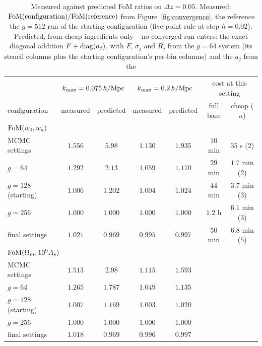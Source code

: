 \documentclass[11pt]{article}
\newcommand{\kmax}{k_{\rm max}}
\newcommand{\hMpc}{\,h/{\rm Mpc}}
\begin{document}
\begin{table}[tbp]
  \centering
  \setlength{\tabcolsep}{4pt}%
  \begin{tabular}{lcccccc}
    \hline
    & \multicolumn{2}{c}{$\kmax = 0.075\hMpc$}
    & \multicolumn{2}{c}{$\kmax = 0.2\hMpc$}
    & \multicolumn{2}{c}{cost at this setting} \\
    configuration & measured & predicted & measured & predicted
                  & full base & cheap ($n$) \\
    \hline
    \multicolumn{7}{l}{${\rm FoM}(w_0, w_a)$} \\
    MCMC settings        & $1.556$ & $5.98$  & $1.130$ & $1.935$ & $10$ min  & $35$ s ($2$) \\
    $g = 64$             & $1.292$ & $2.13$  & $1.059$ & $1.170$ & $29$ min  & $1.7$ min ($2$) \\
    $g = 128$ (starting) & $1.006$ & $1.202$ & $1.004$ & $1.024$ & $44$ min  & $3.7$ min ($3$) \\
    $g = 256$            & $1.000$ & $1.000$ & $1.000$ & $1.000$ & $1.2$ h   & $6.1$ min ($3$) \\
    final settings       & $1.021$ & $0.969$ & $0.995$ & $0.997$ & $50$ min  & $6.8$ min ($5$) \\
    \hline
    \multicolumn{7}{l}{${\rm FoM}(\Omega_m, 10^9 A_s)$} \\
    MCMC settings        & $1.513$ & $2.98$  & $1.115$ & $1.593$ \\
    $g = 64$             & $1.265$ & $1.787$ & $1.049$ & $1.135$ \\
    $g = 128$ (starting) & $1.007$ & $1.169$ & $1.003$ & $1.020$ \\
    $g = 256$            & $1.000$ & $1.000$ & $1.000$ & $1.000$ \\
    final settings       & $1.018$ & $0.969$ & $0.996$ & $0.997$ \\
    \hline
  \end{tabular}
  \caption{Measured against predicted FoM ratios on
    $\Delta z = 0.05$.  Measured:
    ${\rm FoM}({\rm configuration})/{\rm FoM}({\rm reference})$
    from Figure~\ref{fig:convergence}, the reference the $g = 512$
    run of the starting configuration (five-point rule at step
    $h = 0.02$).  Predicted, from cheap ingredients only -- no
    converged run enters: the exact diagonal addition
    $F + {\rm diag}(a_j)$, with $F$, $\sigma_j$ and $R_j$ from the
    $g = 64$ system (its stencil columns plus the starting
    configuration's per-bin columns) and the $a_j$ from the
}
\end{table}
\end{document}
